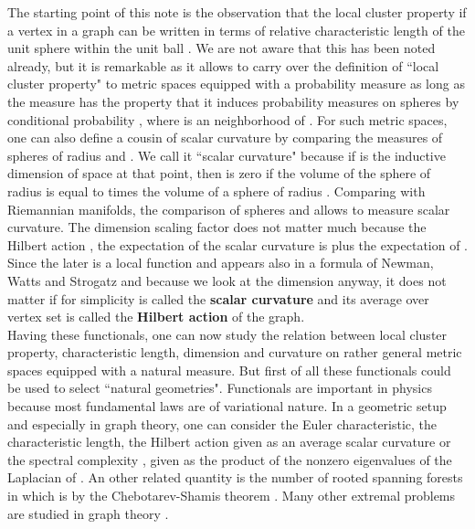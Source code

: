 \documentclass[12pt]{amsart}
\theoremstyle{definition}
\begin{document}
The starting point of this note is the observation that the local cluster property  if a vertex
in a graph can be written in terms of relative characteristic length of the unit sphere  within the 
unit ball  . We are not aware that this has been noted already, but it is remarkable as it allows 
to carry over the definition of ``local cluster property" to metric spaces equipped with a probability measure 
as long as the measure has the property that it induces probability measures  on spheres by 
conditional probability , where
 is an  neighborhood of . For such metric spaces, one can also define a
cousin of scalar curvature  by comparing the measures  
of spheres of radius  and . We call it 
``scalar curvature" because if  is the inductive dimension of space at that point, then 
 is zero if the volume  of the 
sphere of radius  is equal to  times the volume  
of a sphere of radius . Comparing with Riemannian manifolds, the comparison of spheres 
and  allows to measure scalar curvature.  The dimension scaling factor  does not matter 
much because the Hilbert action , the expectation of the scalar 
curvature is  plus the expectation of . Since the later is a local
function and appears also in a formula of Newman, Watts and Strogatz and because we look at the 
dimension  anyway, it does not matter if for simplicity  is called the
{\bf scalar curvature} and its average over vertex set is called the {\bf Hilbert action} 
of the graph.  \\

Having these functionals, one can now study the relation between
local cluster property, characteristic length, dimension and curvature on rather general metric spaces
equipped with a natural measure. But first of all these functionals could be used to select ``natural
geometries".  Functionals are important in physics because most fundamental laws are of variational nature. 
In a geometric setup and especially in graph theory, one can consider the Euler characteristic, 
the characteristic length, the Hilbert action  given as an average scalar curvature or 
the spectral complexity , given as the product of the nonzero eigenvalues of the Laplacian  
of . An other related quantity is the number of rooted spanning forests in  which is 
 by the Chebotarev-Shamis theorem
\cite{ChebotarevShamis2,ChebotarevShamis1,Knillforest,CauchyBinetKnill}.
Many other extremal problems are studied in graph theory \cite{BollobasExtremal}. \\
\end{document}
